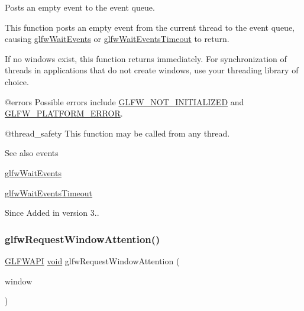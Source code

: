 Posts an empty event to the event queue. 

This function posts an empty event from the current thread to the event queue, causing \mbox{\hyperlink{group__window_ga6e042d05823c11e11c7339b81a237738}{glfw\+Wait\+Events}} or \mbox{\hyperlink{group__window_ga05223a0a4c5e50f10f289e60398153aa}{glfw\+Wait\+Events\+Timeout}} to return.

If no windows exist, this function returns immediately. For synchronization of threads in applications that do not create windows, use your threading library of choice.

@errors Possible errors include \mbox{\hyperlink{group__errors_ga2374ee02c177f12e1fa76ff3ed15e14a}{G\+L\+F\+W\+\_\+\+N\+O\+T\+\_\+\+I\+N\+I\+T\+I\+A\+L\+I\+Z\+ED}} and \mbox{\hyperlink{group__errors_gad44162d78100ea5e87cdd38426b8c7a1}{G\+L\+F\+W\+\_\+\+P\+L\+A\+T\+F\+O\+R\+M\+\_\+\+E\+R\+R\+OR}}.

@thread\+\_\+safety This function may be called from any thread.

\begin{DoxySeeAlso}{See also}
events 

\mbox{\hyperlink{group__window_ga6e042d05823c11e11c7339b81a237738}{glfw\+Wait\+Events}} 

\mbox{\hyperlink{group__window_ga05223a0a4c5e50f10f289e60398153aa}{glfw\+Wait\+Events\+Timeout}}
\end{DoxySeeAlso}
\begin{DoxySince}{Since}
Added in version 3.. 
\end{DoxySince}
\mbox{\label{group__window_gad0c9629abb49447bedd28080642b8538}} 
\subsubsection{\texorpdfstring{glfwRequestWindowAttention()}{glfwRequestWindowAttention()}}
{\footnotesize\ttfamily \mbox{\hyperlink{glfw3_8h_a56da5036b2cc259351ae22fd6439bb47}{G\+L\+F\+W\+A\+PI}} \mbox{\hyperlink{glad_8h_a950fc91edb4504f62f1c577bf4727c29}{void}} glfw\+Request\+Window\+Attention (\begin{DoxyParamCaption}\item[{\mbox{\hyperlink{group__window_ga3c96d80d363e67d13a41b5d1821f3242}{G\+L\+F\+Wwindow}} $\ast$}]{window }\end{DoxyParamCaption})}



